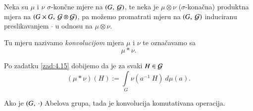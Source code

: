 \begin{defn}    \label{defn:7.11-2}
    Neka su $\mu$ i $\nu$ $\sigma$-kon\v cne mjere na $({G}, \: {\mathcal{G}})$, te neka je $\mu \otimes \nu$ ($\sigma$-kona\v cna) produktna mjera na $({G \times G}, \: {\mathcal{G} \otimes \mathcal{G}})$, pa mo\v zemo promatrati mjeru na $({G}, \: {\mathcal{G}})$ induciranu preslikavanjem $\cdot$ u odnosu na $\mu \otimes \nu$.
    
    Tu mjeru nazivamo \emph{konvolucijom} mjera $\mu$ i $\nu$ te ozna\v cavamo sa
    \begin{equation*}
        \mu * \nu.
    \end{equation*}
\end{defn}

Po zadatku \ref{zad:4.15} dobijemo da je za svaki $H \in \mathcal{G}$
\begin{equation*}   \label{jed:7.12}
    (\mu * \nu)(H) := \int\limits_G \nu (a^{-1} \: H) \: d \mu (a).
\end{equation*}

\begin{zad} \label{zad:7.13}
    Ako je $({G}, \: {\cdot})$ Abelova grupa, tada je konvolucija komutativana operacija.
\end{zad}

